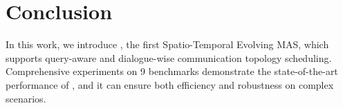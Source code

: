 \section{Conclusion}
In this work, we introduce \ourmethod, the first Spatio-Temporal Evolving MAS, which supports query-aware and dialogue-wise communication topology scheduling. Comprehensive experiments on 9 benchmarks demonstrate the state-of-the-art performance of \ourmethod, and it can ensure both efficiency and robustness on complex scenarios.